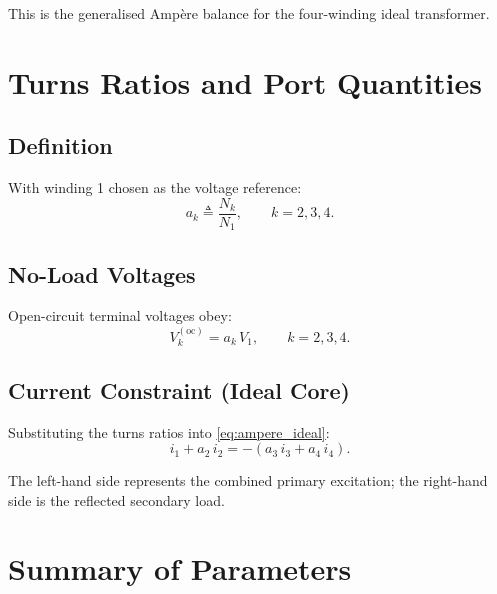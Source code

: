 \documentclass[11pt,a4paper]{article}
\begin{document}
This is the generalised Ampère balance for the four-winding ideal transformer.

\section{Turns Ratios and Port Quantities}

\subsection{Definition}

With winding 1 chosen as the voltage reference:
\begin{equation}
  a_k \triangleq \frac{N_k}{N_1}, \qquad k = 2,3,4.
  \label{eq:turns_ratio}
\end{equation}

\subsection{No-Load Voltages}

Open-circuit terminal voltages obey:
\begin{equation}
  V_k^{(\text{oc})} = a_k\,V_1, \qquad k = 2,3,4.
  \label{eq:voltage_ratio}
\end{equation}

\subsection{Current Constraint (Ideal Core)}

Substituting the turns ratios into \eqref{eq:ampere_ideal}:
\begin{equation}
  i_1 + a_2\,i_2 = -(a_3\,i_3 + a_4\,i_4).
  \label{eq:current_balance}
\end{equation}

The left-hand side represents the combined primary excitation; the right-hand
side is the reflected secondary load.

\section{Summary of Parameters}
\end{document}
